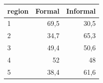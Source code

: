 \begin{tabular}{lrr}
\toprule
region & Formal & Informal \\
\midrule
1 & 69,5 & 30,5 \\
2 & 34,7 & 65,3 \\
3 & 49,4 & 50,6 \\
4 & 52 & 48 \\
5 & 38,4 & 61,6 \\
\bottomrule
\end{tabular}
